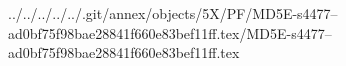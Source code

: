 ../../../../../.git/annex/objects/5X/PF/MD5E-s4477--ad0bf75f98bae28841f660e83bef11ff.tex/MD5E-s4477--ad0bf75f98bae28841f660e83bef11ff.tex